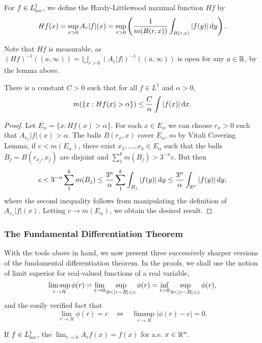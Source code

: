 \documentclass[12pt]{article} %
\begin{document}
\begin{definition}
    For $f \in L_{\operatorname{loc}}^1$, we define the Hardy-Littlewood maximal function $Hf$ by \[Hf(x) = \sup_{r > 0} A_r |f|(x) = \sup_{r > 0} \left( \frac{1}{m(B(r, x))} \int_{B(r, x)} |f(y)|\, \mathrm{d} y \right).\]
\end{definition}

\noindent Note that $Hf$ is measurable, as $(Hf)^{-1}((a, \infty)) = \bigcup_{r > 0} (A_r|f|)^{-1}((a, \infty))$ is open for any $a \in \mathbb{R}$, by the lemma above.

\begin{theorem}
    There is a constant $C > 0$ such that for all $f \in L^1$ and $\alpha > 0$, \[m(\{x : Hf(x) > \alpha\}) \leq \frac{C}{\alpha} \int |f(x)| \, \mathrm{d} x.\]
\end{theorem}

\begin{proof}
    Let $E_\alpha = \{x : Hf(x) > \alpha\}$. For each $x \in E_\alpha$ we can choose $r_x > 0$ such that $A_{r_x}|f|(x) > \alpha$. The balls $B(r_x, x)$ cover $E_\alpha$, so by Vitali Covering Lemma, if $c < m(E_\alpha)$, there exist $x_1, \ldots, x_k \in E_\alpha$ such that the balls $B_j = B(r_{x_j}, x_j)$ are disjoint and $\sum_1^k m(B_j) > 3^{-n} c$. But then \[c < 3^{-n} \sum_1^k m(B_j) \leq \frac{3^n}{\alpha} \sum_1^k \int_{B_j} |f(y)|\, \mathrm{d} y \leq \frac{3^n}{\alpha} \int_{\mathbb{R}^n} |f(y)|\, \mathrm{d} y,\] where the second inequality follows from manipulating the definition of $A_{r_x}|f|(x)$. Letting $c \to m(E_\alpha)$, we obtain the desired result.
\end{proof}

\subsubsection{The Fundamental Differentiation Theorem}

With the tools above in hand, we now present three successively sharper versions of the fundamental differentiation theorem. In the proofs, we shall use the notion of limit superior for real-valued functions of a real variable, \[\limsup_{r \to R} \phi(r) = \lim_{\varepsilon \to 0} \sup_{0 < |r - R| < \varepsilon} \phi(r) = \inf_{\varepsilon > 0} \sup_{0 < |r - R| < \varepsilon} \phi(r),\] and the easily verified fact that \[\lim_{r \to R} \phi(r) = c \ \ \ \ \iff \ \ \ \ \limsup_{r \to R} |\phi(r) - c| = 0.\]

\begin{theorem}
    If $f \in L_{\operatorname{loc}}^1$, the $\lim_{r \to 0} A_r f(x) = f(x)$ for a.e. $x \in \mathbb{R}^n$.
\end{theorem}
\end{document}
